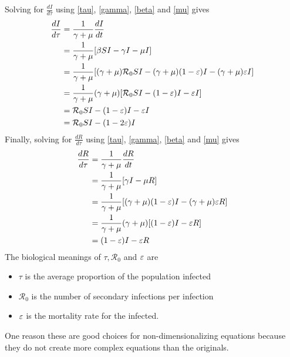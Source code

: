 Solving for $\frac{dI}{d\tau}$ using \ref{tau}, \ref{gamma}, \ref{beta} and \ref{mu} gives
\begin{align}
    \frac{dI}{d\tau} &= \frac{1}{\gamma+\mu}\frac{dI}{dt}\nonumber\\
     &= \frac{1}{\gamma+\mu}[\beta SI -\gamma I-\mu I]\nonumber\\
     &= \frac{1}{\gamma+\mu}[(\gamma+\mu){\mathcal R_0}SI -(\gamma+\mu)(1-\varepsilon) I-(\gamma+\mu)\varepsilon I]\nonumber\\
     &= \frac{1}{\gamma+\mu}(\gamma+\mu)[{\mathcal R_0}SI -(1-\varepsilon) I-\varepsilon I]\nonumber\\
     &= {\mathcal R_0}SI -(1-\varepsilon) I-\varepsilon I\nonumber\\
     &= {\mathcal R_0}SI -(1-2\varepsilon) I
\end{align}
Finally, solving for $\frac{dR}{d\tau}$ using \ref{tau}, \ref{gamma}, \ref{beta} and \ref{mu} gives
\begin{align*}
    \frac{dR}{d\tau} &= \frac{1}{\gamma+\mu}\frac{dR}{dt}\nonumber\\
     &= \frac{1}{\gamma+\mu}[\gamma I - \mu R]\nonumber\\
     &= \frac{1}{\gamma+\mu}[(\gamma+\mu)(1-\varepsilon)I - (\gamma+\mu)\varepsilon R]\nonumber\\
     &= \frac{1}{\gamma+\mu}(\gamma+\mu)[(1-\varepsilon)I - \varepsilon R]\nonumber\\
     &= (1-\varepsilon)I - \varepsilon R
\end{align*}
The biological meanings of $\tau, {\mathcal R_0}$ and $\varepsilon$ are
\begin{itemize}
    \item $\tau$ is the average proportion of the population infected
    \item ${\mathcal R_0}$ is the number of secondary infections per infection
    \item $\varepsilon$ is the mortality rate for the infected.
\end{itemize}
One reason these are good choices for non-dimensionalizing equations because they do not create more complex equations than the originals.

